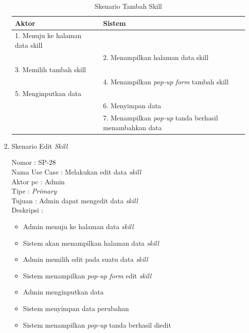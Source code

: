 \begin{enumerate}
\begin{table}
	\caption{Skenario Tambah Skill}
	\centering
	\begin{tabular}{ | l | p{73.5mm} |}
		\hline 
		\textbf{Aktor} & \textbf{Sistem} \\
		\hline
		
		1.	Menuju ke halaman data skill &  \\
		
		\hline
		
		&  2.	Menampilkan halaman data skill \\
		
		\hline
		
		3. Memilih tambah skill & \\
		
		\hline
		
		& 4.	Menampilkan \textit{pop-up form} tambah skill \\
		
		\hline
		
		5.	Menginputkan data  & \\
		\hline
		
		& 6.	Menyimpan data \\
		\hline
		
		& 7.	Menampilkan \textit{pop-up} tanda berhasil menambahkan data \\
		\hline
		
	\end{tabular}
\end{table}

\item Skenario Edit \textit{Skill}

Nomor \kern 3.6pc : SP-28 \\
Nama Use Case : Melakukan edit data \textit{skill} \\
Aktor  pc : Admin \\
Tipe \kern 4.6pc : \textit{Primary} \\
Tujuan \kern 3.6pc : Admin dapat mengedit data \textit{skill} \\
Deskripsi \kern 2.5pc : 

\begin{itemize}
	\item Admin menuju ke halaman data \textit{skill}
	\item Sistem akan menampilkan halaman data \textit{skill}
	\item Admin memilih edit pada suatu data \textit{skill}
	\item Sistem menampilkan \textit{pop-up form} edit \textit{skill}
	\item Admin menginputkan data
	\item Sistem menyimpan data perubahan
	\item Sistem menampilkan \textit{pop-up} tanda berhasil diedit
	

\end{itemize}
\end{enumerate}
